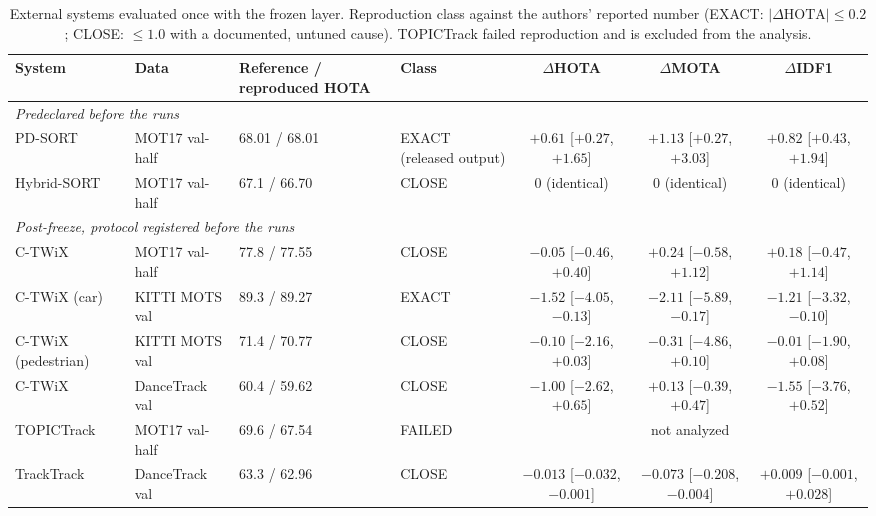 \begin{table}
\centering
\caption{External systems evaluated once with the frozen layer. Reproduction class against the authors' reported number (EXACT: $|\Delta\mathrm{HOTA}|\le0.2$; CLOSE: $\le1.0$ with a documented, untuned cause). TOPICTrack failed reproduction and is excluded from the analysis.}
\label{tab:ch5-external}
\small\setlength{\tabcolsep}{4pt}
\begin{adjustbox}{max width=\textheight}
\begin{tabular}{llllccc}
\hline
System & Data & Reference / reproduced HOTA & Class & $\Delta$HOTA & $\Delta$MOTA & $\Delta$IDF1 \\
\hline
\multicolumn{7}{l}{\textit{Predeclared before the runs}}\\
PD-SORT & MOT17 val-half & 68.01 / 68.01 & EXACT (released output) & {\boldmath $+0.61$ [$+0.27$, $+1.65$]} & {\boldmath $+1.13$ [$+0.27$, $+3.03$]} & {\boldmath $+0.82$ [$+0.43$, $+1.94$]} \\
Hybrid-SORT & MOT17 val-half & 67.1 / 66.70 & CLOSE & 0 (identical) & 0 (identical) & 0 (identical) \\
\multicolumn{7}{l}{\textit{Post-freeze, protocol registered before the runs}}\\
C-TWiX & MOT17 val-half & 77.8 / 77.55 & CLOSE & $-0.05$ [$-0.46$, $+0.40$] & $+0.24$ [$-0.58$, $+1.12$] & $+0.18$ [$-0.47$, $+1.14$] \\
C-TWiX (car) & KITTI MOTS val & 89.3 / 89.27 & EXACT & {\boldmath $-1.52$ [$-4.05$, $-0.13$]} & {\boldmath $-2.11$ [$-5.89$, $-0.17$]} & {\boldmath $-1.21$ [$-3.32$, $-0.10$]} \\
C-TWiX (pedestrian) & KITTI MOTS val & 71.4 / 70.77 & CLOSE & $-0.10$ [$-2.16$, $+0.03$] & $-0.31$ [$-4.86$, $+0.10$] & $-0.01$ [$-1.90$, $+0.08$] \\
C-TWiX & DanceTrack val & 60.4 / 59.62 & CLOSE & $-1.00$ [$-2.62$, $+0.65$] & $+0.13$ [$-0.39$, $+0.47$] & $-1.55$ [$-3.76$, $+0.52$] \\
TOPICTrack & MOT17 val-half & 69.6 / 67.54 & FAILED & \multicolumn{3}{c}{not analyzed} \\
TrackTrack & DanceTrack val & 63.3 / 62.96 & CLOSE & {\boldmath $-0.013$ [$-0.032$, $-0.001$]} & {\boldmath $-0.073$ [$-0.208$, $-0.004$]} & $+0.009$ [$-0.001$, $+0.028$] \\
\hline
\end{tabular}
\end{adjustbox}
\end{table}
